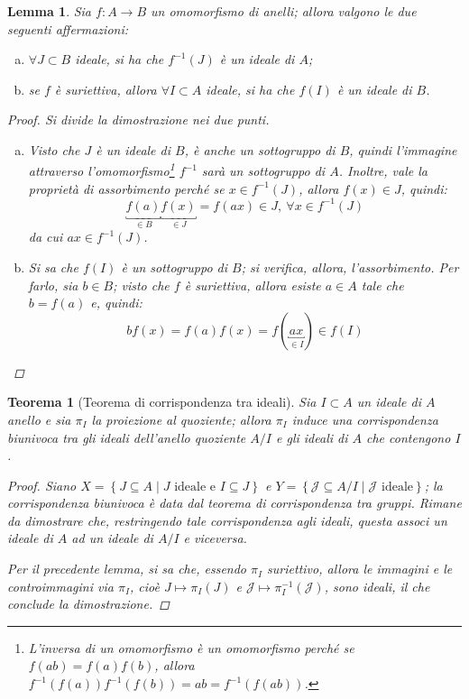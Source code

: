 \documentclass[12pt]{scrartcl}
\theoremstyle{style}
\newtheorem{teorema}{Teorema}[section]
\newtheorem{lemma}{Lemma}[teorema]
\numberwithin{equation}{subsection}
\begin{document}
\begin{lemma}
	Sia $f: A\to B$ un omomorfismo di anelli; allora valgono le due seguenti affermazioni:
\begin{enumerate}[(a).]
	\item $\forall J \subset B$ ideale, si ha che $f^{-1}(J)$ \`e un ideale di $A$;
	\item se $f$ \`e suriettiva, allora $\forall I \subset A$ ideale, si ha che $f(I)$ \`e un ideale di $B$.
\end{enumerate}
		\begin{proof}
			Si divide la dimostrazione nei due punti.
			\begin{enumerate}[(a).]
				\item Visto che $J$ \`e un ideale di $B$, \`e anche un sottogruppo di $B$, quindi l'immagine attraverso l'omomorfismo\footnote{L'inversa di un omomorfismo \`e un omomorfismo perch\'e se $f(ab) = f(a)f(b)$, allora $f^{-1}(f(a)) f^{-1}(f(b)) =ab= f^{-1}(f(ab))$.} $f^{-1}$ sar\`a un sottogruppo di $A$.
					Inoltre, vale la propriet\`a di assorbimento perch\'e se $x \in f^{-1}(J)$, allora $f(x) \in J$, quindi:
					\[
						\underbracket{f(a)}_{\in B} \underbracket{f(x)}_{\in J}  = f(ax) \in J, \ \forall x \in f^{-1}(J)
					\] 
					da cui $ax \in f^{-1}(J)$.
				\item Si sa che $f(I)$ \`e un sottogruppo di $B$; si verifica, allora, l'assorbimento. 
					Per farlo, sia $b \in B$; visto che $f$ \`e suriettiva, allora esiste $a \in A $ tale che $b = f(a)$ e, quindi:
					\[
						b f(x) = f(a) f(x) = f(\underbracket{ax}_{\in I} ) \in f(I)
					\] 
			\end{enumerate}
		\end{proof}
\end{lemma}
\begin{teorema}
	[Teorema di corrispondenza tra ideali]
	Sia $I \subset A$ un ideale di $A$ anello e sia $\pi_I$ la proiezione al quoziente; allora $\pi_I$ induce una corrispondenza biunivoca tra gli ideali dell'anello quoziente $A / I$ e gli ideali di $A$ che contengono $I$.
	\begin{proof}
		Siano $X = \left\{ J \subseteq A  \mid J \text{ ideale e } I \subseteq J\right\} $ e $Y = \left\{ \mathcal{J} \subseteq A / I  \mid \mathcal{J} \text{ ideale} \right\} $; la corrispondenza biunivoca \`e data dal teorema di corrispondenza tra gruppi. 
		Rimane da dimostrare che, restringendo tale corrispondenza agli ideali, questa associ un ideale di $A$ ad un ideale di $A / I$ e viceversa.

		Per il precedente lemma, si sa che, essendo $\pi_I$ suriettivo, allora le immagini e le controimmagini via $\pi_I$, cio\`e $J \longmapsto \pi_I (J)$ e $ \mathcal{J} \longmapsto \pi^{-1}_I(\mathcal{J} )$, sono ideali, il che conclude la dimostrazione.
	\end{proof}
\end{teorema}
\end{document}
